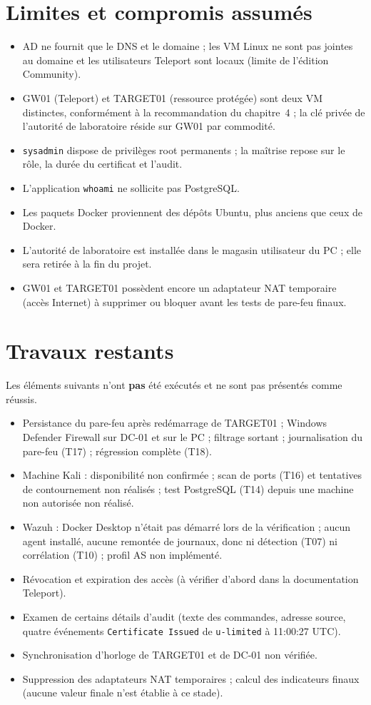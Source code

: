 \documentclass[11pt,a4paper]{report}
\begin{document}
\section{Limites et compromis assumés}
\begin{itemize}
\item AD ne fournit que le DNS et le domaine ; les VM Linux ne sont pas jointes au domaine et les utilisateurs Teleport sont locaux (limite de l'édition Community).
\item GW01 (Teleport) et TARGET01 (ressource protégée) sont deux VM distinctes, conformément à la recommandation du chapitre~4 ; la clé privée de l'autorité de laboratoire réside sur GW01 par commodité.
\item \texttt{sysadmin} dispose de privilèges root permanents ; la maîtrise repose sur le rôle, la durée du certificat et l'audit.
\item L'application \texttt{whoami} ne sollicite pas PostgreSQL.
\item Les paquets Docker proviennent des dépôts Ubuntu, plus anciens que ceux de Docker.
\item L'autorité de laboratoire est installée dans le magasin utilisateur du PC ; elle sera retirée à la fin du projet.
\item GW01 et TARGET01 possèdent encore un adaptateur NAT temporaire (accès Internet) à supprimer ou bloquer avant les tests de pare-feu finaux.
\end{itemize}

\section{Travaux restants}\label{sec:reste}
Les éléments suivants n'ont \textbf{pas} été exécutés et ne sont pas présentés comme réussis.
\begin{itemize}
\item Persistance du pare-feu après redémarrage de TARGET01 ; Windows Defender Firewall sur DC-01 et sur le PC ; filtrage sortant ; journalisation du pare-feu (T17) ; régression complète (T18).
\item Machine Kali : disponibilité non confirmée ; scan de ports (T16) et tentatives de contournement non réalisés ; test PostgreSQL (T14) depuis une machine non autorisée non réalisé.
\item Wazuh : Docker Desktop n'était pas démarré lors de la vérification ; aucun agent installé, aucune remontée de journaux, donc ni détection (T07) ni corrélation (T10) ; profil AS non implémenté.
\item Révocation et expiration des accès (à vérifier d'abord dans la documentation Teleport).
\item Examen de certains détails d'audit (texte des commandes, adresse source, quatre événements \texttt{Certificate Issued} de \texttt{u-limited} à 11:00:27 UTC).
\item Synchronisation d'horloge de TARGET01 et de DC-01 non vérifiée.
\item Suppression des adaptateurs NAT temporaires ; calcul des indicateurs finaux (aucune valeur finale n'est établie à ce stade).
\end{itemize}
\end{document}
